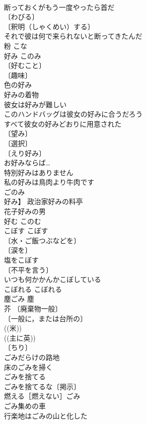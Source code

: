 \documentclass[8pt]{extreport}
\begin{document}
\begin{CJK}{UTF8}{min}
\\	断っておくがもう一度やったら首だ 
\\	〔わびる〕
\\	〔釈明（しゃくめい）する〕
\\	それで彼は何で来られないと断ってきたんだ 
\\	粉	こな	
\\	好み	このみ	
\\	〔好むこと〕
\\	〔趣味〕
\\	色の好み 
\\	好みの着物 
\\	彼女は好みが難しい 
\\	このハンドバッグは彼女の好みに合うだろう 
\\	すべて彼女の好みどおりに用意された 
\\	〔望み〕
\\	〔選択〕
\\	〔えり好み〕
\\	お好みならば… 
\\	特別好みはありません 
\\	私の好みは鳥肉より牛肉です 
\\	ごのみ
\\	好み】 政治家好みの料亭 
\\	花子好みの男 
\\	好む	このむ	
\\	こぼす	こぼす	
\\	〔水・ご飯つぶなどを〕
\\	〔涙を〕
\\	塩をこぼす 
\\	〔不平を言う〕
\\	いつも何かかんかこぼしている 
\\	こぼれる	こぼれる	
\\	塵ごみ	塵 
\\	芥	〔廃棄物一般〕
\\	〔一般に，または台所の〕
\\	((米)) 
\\	((主に英)) 
\\	〔ちり〕
\\	ごみだらけの路地 
\\	床のごみを掃く 
\\	ごみを捨てる 
\\	ごみを捨てるな〔掲示〕 
\\	燃える［燃えない］ごみ 
\\	ごみ集めの車 
\\	行楽地はごみの山と化した 

\end{CJK}
\end{document}
